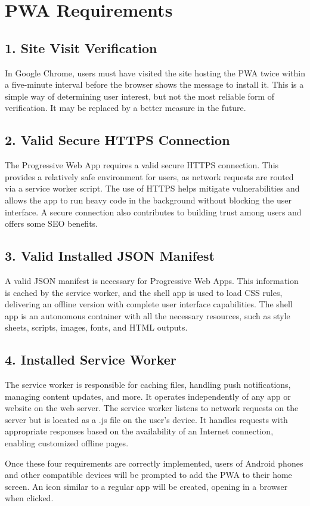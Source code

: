 \documentclass[12pt]{article}
\begin{document}
\section{PWA Requirements}

\subsection*{1. Site Visit Verification}

In Google Chrome, users must have visited the site hosting the PWA twice within a five-minute interval before the browser shows the message to install it. This is a simple way of determining user interest, but not the most reliable form of verification. It may be replaced by a better measure in the future.

\subsection*{2. Valid Secure HTTPS Connection}

The Progressive Web App requires a valid secure HTTPS connection. This provides a relatively safe environment for users, as network requests are routed via a service worker script. The use of HTTPS helps mitigate vulnerabilities and allows the app to run heavy code in the background without blocking the user interface. A secure connection also contributes to building trust among users and offers some SEO benefits.

\subsection*{3. Valid Installed JSON Manifest}

A valid JSON manifest is necessary for Progressive Web Apps. This information is cached by the service worker, and the shell app is used to load CSS rules, delivering an offline version with complete user interface capabilities. The shell app is an autonomous container with all the necessary resources, such as style sheets, scripts, images, fonts, and HTML outputs.

\subsection*{4. Installed Service Worker}

The service worker is responsible for caching files, handling push notifications, managing content updates, and more. It operates independently of any app or website on the web server. The service worker listens to network requests on the server but is located as a .js file on the user's device. It handles requests with appropriate responses based on the availability of an Internet connection, enabling customized offline pages.

Once these four requirements are correctly implemented, users of Android phones and other compatible devices will be prompted to add the PWA to their home screen. An icon similar to a regular app will be created, opening in a browser when clicked.

\citep{pwaRequirements}

 
 
\end{document}
